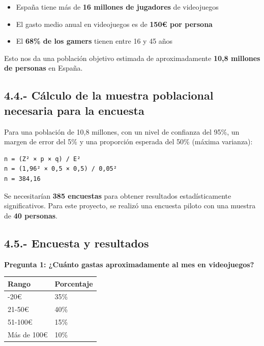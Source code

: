 \documentclass[
  spanish,
  11pt,
  paper=a4,
  ,captions=tableheading
]{scrartcl}
\providecommand{\tightlist}{%
  \setlength{\itemsep}{0pt}\setlength{\parskip}{0pt}}
\begin{document}
\begin{itemize}
\tightlist
\item
  España tiene más de \textbf{16 millones de jugadores} de videojuegos
\item
  El gasto medio anual en videojuegos es de \textbf{150€ por persona}
\item
  El \textbf{68\% de los gamers} tienen entre 16 y 45 años
\end{itemize}

Esto nos da una población objetivo estimada de aproximadamente
\textbf{10,8 millones de personas} en España.

\hypertarget{cuxe1lculo-de-la-muestra-poblacional-necesaria-para-la-encuesta}{%
\subsection{4.4.- Cálculo de la muestra poblacional necesaria para la
encuesta}\label{cuxe1lculo-de-la-muestra-poblacional-necesaria-para-la-encuesta}}

Para una población de 10,8 millones, con un nivel de confianza del 95\%,
un margen de error del 5\% y una proporción esperada del 50\% (máxima
varianza):

\begin{verbatim}
n = (Z² × p × q) / E²
n = (1,96² × 0,5 × 0,5) / 0,05²
n = 384,16
\end{verbatim}

Se necesitarían \textbf{385 encuestas} para obtener resultados
estadísticamente significativos. Para este proyecto, se realizó una
encuesta piloto con una muestra de \textbf{40 personas}.

\hypertarget{encuesta-y-resultados}{%
\subsection{4.5.- Encuesta y resultados}\label{encuesta-y-resultados}}

\textbf{Pregunta 1: ¿Cuánto gastas aproximadamente al mes en
videojuegos?}

\begin{longtable}[]{@{}ll@{}}
\toprule\noalign{}
Rango & Porcentaje \\
\midrule\noalign{}
\endhead
\bottomrule\noalign{}
\endlastfoot
0-20€ & 35\% \\
21-50€ & 40\% \\
51-100€ & 15\% \\
Más de 100€ & 10\% \\
\end{longtable}
\end{document}
